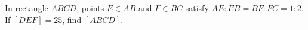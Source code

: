 In rectangle $ABCD$, points $E\in AB$ and $F\in BC$ satisfy $AE:EB=BF:FC=1:2$. If $[DEF]=25$, find $[ABCD]$.
